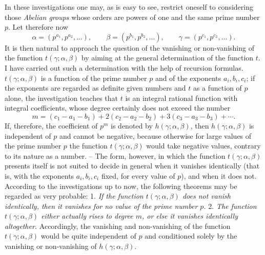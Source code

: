 \documentclass[11pt,a4paper]{article}
\begin{document}
In these investigations one may, as is easy to see, restrict oneself to considering those \emph{Abelian groups} whose orders are powers of one and the same prime number $p$. Let therefore now
\[
 \alpha=(p^{a_1},p^{a_2},\ldots),\qquad
 \beta=(p^{b_1},p^{b_2},\ldots),\qquad
 \gamma=(p^{c_1},p^{c_2},\ldots).
\]
It is then natural to approach the question of the vanishing or non-vanishing of the function $t(\gamma;\alpha,\beta)$ by aiming at the general determination of the function $t$. I have carried out such a determination with the help of recursion formulas. $t(\gamma;\alpha,\beta)$ is a function of the prime number $p$ and of the exponents $a_i,b_i,c_i$; if the exponents are regarded as definite given numbers and $t$ as a function of $p$ alone, the investigation teaches that $t$ is an integral rational function with integral coefficients, whose degree certainly does not exceed the number
\[
 m=(c_1-a_1-b_1)+2(c_2-a_2-b_2)+3(c_3-a_3-b_3)+\cdots.
\]
If, therefore, the coefficient of $p^m$ is denoted by $h(\gamma;\alpha,\beta)$, then $h(\gamma;\alpha,\beta)$ is independent of $p$ and cannot be negative, because otherwise for large values of the prime number $p$ the function $t(\gamma;\alpha,\beta)$ would take negative values, contrary to its nature as a number. -- The form, however, in which the function $t(\gamma;\alpha,\beta)$ presents itself is not suited to decide in general when it vanishes identically (that is, with the exponents $a_i,b_i,c_i$ fixed, for every value of $p$), and when it does not. According to the investigations up to now, the following theorems may be regarded as very probable: 1. \emph{If the function $t(\gamma;\alpha,\beta)$ does not vanish identically, then it vanishes for no value of the prime number $p$.} 2. \emph{The function $t(\gamma;\alpha,\beta)$ either actually rises to degree $m$, or else it vanishes identically altogether.} Accordingly, the vanishing and non-vanishing of the function $t(\gamma;\alpha,\beta)$ would be quite independent of $p$ and conditioned solely by the vanishing or non-vanishing of $h(\gamma;\alpha,\beta)$.
\end{document}
